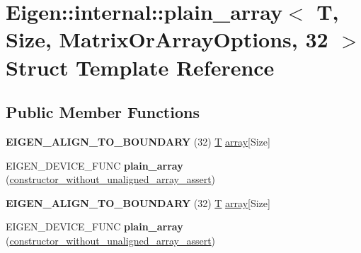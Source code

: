 \hypertarget{struct_eigen_1_1internal_1_1plain__array_3_01_t_00_01_size_00_01_matrix_or_array_options_00_0132_01_4}{}\section{Eigen\+:\+:internal\+:\+:plain\+\_\+array$<$ T, Size, Matrix\+Or\+Array\+Options, 32 $>$ Struct Template Reference}
\label{struct_eigen_1_1internal_1_1plain__array_3_01_t_00_01_size_00_01_matrix_or_array_options_00_0132_01_4}
\subsection*{Public Member Functions}
\begin{DoxyCompactItemize}
\item 
\mbox{\label{struct_eigen_1_1internal_1_1plain__array_3_01_t_00_01_size_00_01_matrix_or_array_options_00_0132_01_4_a7eaecb638c0586dd70cd7e4e1e82f8b9}} 
{\bfseries E\+I\+G\+E\+N\+\_\+\+A\+L\+I\+G\+N\+\_\+\+T\+O\+\_\+\+B\+O\+U\+N\+D\+A\+RY} (32) \hyperlink{group___sparse_core___module}{T} \hyperlink{class_eigen_1_1array}{array}\mbox{[}Size\mbox{]}
\item 
\mbox{\label{struct_eigen_1_1internal_1_1plain__array_3_01_t_00_01_size_00_01_matrix_or_array_options_00_0132_01_4_a4c86669c116bfd845b8c1dc9107724de}} 
E\+I\+G\+E\+N\+\_\+\+D\+E\+V\+I\+C\+E\+\_\+\+F\+U\+NC {\bfseries plain\+\_\+array} (\hyperlink{struct_eigen_1_1internal_1_1constructor__without__unaligned__array__assert}{constructor\+\_\+without\+\_\+unaligned\+\_\+array\+\_\+assert})
\item 
\mbox{\label{struct_eigen_1_1internal_1_1plain__array_3_01_t_00_01_size_00_01_matrix_or_array_options_00_0132_01_4_a7eaecb638c0586dd70cd7e4e1e82f8b9}} 
{\bfseries E\+I\+G\+E\+N\+\_\+\+A\+L\+I\+G\+N\+\_\+\+T\+O\+\_\+\+B\+O\+U\+N\+D\+A\+RY} (32) \hyperlink{group___sparse_core___module}{T} \hyperlink{class_eigen_1_1array}{array}\mbox{[}Size\mbox{]}
\item 
\mbox{\label{struct_eigen_1_1internal_1_1plain__array_3_01_t_00_01_size_00_01_matrix_or_array_options_00_0132_01_4_a4c86669c116bfd845b8c1dc9107724de}} 
E\+I\+G\+E\+N\+\_\+\+D\+E\+V\+I\+C\+E\+\_\+\+F\+U\+NC {\bfseries plain\+\_\+array} (\hyperlink{struct_eigen_1_1internal_1_1constructor__without__unaligned__array__assert}{constructor\+\_\+without\+\_\+unaligned\+\_\+array\+\_\+assert})
\end{DoxyCompactItemize}


